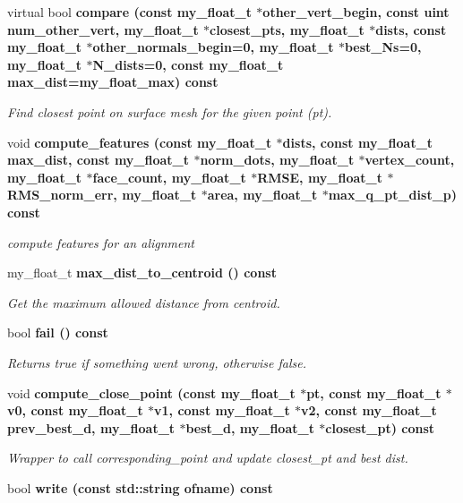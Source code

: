 \begin{CompactItemize}
\item 
virtual bool \bf{compare} (const my\_\-float\_\-t $\ast$other\_\-vert\_\-begin, const uint num\_\-other\_\-vert, my\_\-float\_\-t $\ast$closest\_\-pts, my\_\-float\_\-t $\ast$dists, const my\_\-float\_\-t $\ast$other\_\-normals\_\-begin=0, my\_\-float\_\-t $\ast$best\_\-Ns=0, my\_\-float\_\-t $\ast$N\_\-dists=0, const my\_\-float\_\-t max\_\-dist=my\_\-float\_\-max) const 
\begin{CompactList}\small\item\em Find closest point on surface mesh for the given point (pt). \item\end{CompactList}\item 
void \bf{compute\_\-features} (const my\_\-float\_\-t $\ast$dists, const my\_\-float\_\-t max\_\-dist, const my\_\-float\_\-t $\ast$norm\_\-dots, my\_\-float\_\-t $\ast$vertex\_\-count, my\_\-float\_\-t $\ast$face\_\-count, my\_\-float\_\-t $\ast$RMSE, my\_\-float\_\-t $\ast$RMS\_\-norm\_\-err, my\_\-float\_\-t $\ast$area, my\_\-float\_\-t $\ast$max\_\-q\_\-pt\_\-dist\_\-p) const 
\begin{CompactList}\small\item\em compute features for an alignment \item\end{CompactList}\item 
my\_\-float\_\-t \bf{max\_\-dist\_\-to\_\-centroid} () const \label{classASCbase_1_1geometry_1_1SimpleTrimeshTwo_84a7994256c468de4923e4cb062582b7}

\begin{CompactList}\small\item\em Get the maximum allowed distance from centroid. \item\end{CompactList}\item 
bool \bf{fail} () const \label{classASCbase_1_1geometry_1_1SimpleTrimeshTwo_b72565f595d0855f744b944d3f7eaf5b}

\begin{CompactList}\small\item\em Returns true if something went wrong, otherwise false. \item\end{CompactList}\item 
void \bf{compute\_\-close\_\-point} (const my\_\-float\_\-t $\ast$pt, const my\_\-float\_\-t $\ast$v0, const my\_\-float\_\-t $\ast$v1, const my\_\-float\_\-t $\ast$v2, const my\_\-float\_\-t prev\_\-best\_\-d, my\_\-float\_\-t $\ast$best\_\-d, my\_\-float\_\-t $\ast$closest\_\-pt) const 
\begin{CompactList}\small\item\em Wrapper to call corresponding\_\-point and update closest\_\-pt and best dist. \item\end{CompactList}\item 
bool \bf{write} (const std::string ofname) const \label{classASCbase_1_1geometry_1_1SimpleTrimeshTwo_4d86adb16d5464d99550bb826db10d51}


\end{CompactItemize}
